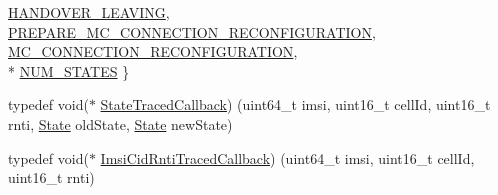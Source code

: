 \begin{DoxyCompactItemize}
\hyperlink{classns3_1_1UeManager_a2f4085fdd18d7125c27da44a5b8b6808ae67953d7b8e117cbd2cab21a1fcde8ad}{H\+A\+N\+D\+O\+V\+E\+R\+\_\+\+L\+E\+A\+V\+I\+NG}, 
\hyperlink{classns3_1_1UeManager_a2f4085fdd18d7125c27da44a5b8b6808aca9c82460eb5d1d8fcebbfc0c4a9167b}{P\+R\+E\+P\+A\+R\+E\+\_\+\+M\+C\+\_\+\+C\+O\+N\+N\+E\+C\+T\+I\+O\+N\+\_\+\+R\+E\+C\+O\+N\+F\+I\+G\+U\+R\+A\+T\+I\+ON}, 
\hyperlink{classns3_1_1UeManager_a2f4085fdd18d7125c27da44a5b8b6808a263ff177d041c66b6a07b69e2be5562e}{M\+C\+\_\+\+C\+O\+N\+N\+E\+C\+T\+I\+O\+N\+\_\+\+R\+E\+C\+O\+N\+F\+I\+G\+U\+R\+A\+T\+I\+ON}, 
\\*
\hyperlink{classns3_1_1UeManager_a2f4085fdd18d7125c27da44a5b8b6808a55259373fd7fb9170cc87c2170d08146}{N\+U\+M\+\_\+\+S\+T\+A\+T\+ES}
 \}
\item 
typedef void($\ast$ \hyperlink{classns3_1_1UeManager_a1f96734afb6ce1a48b78d0db7c987882}{State\+Traced\+Callback}) (uint64\+\_\+t imsi, uint16\+\_\+t cell\+Id, uint16\+\_\+t rnti, \hyperlink{classns3_1_1UeManager_a2f4085fdd18d7125c27da44a5b8b6808}{State} old\+State, \hyperlink{classns3_1_1UeManager_a2f4085fdd18d7125c27da44a5b8b6808}{State} new\+State)
\item 
typedef void($\ast$ \hyperlink{classns3_1_1UeManager_ab48e55f403542cb7718724de271b658b}{Imsi\+Cid\+Rnti\+Traced\+Callback}) (uint64\+\_\+t imsi, uint16\+\_\+t cell\+Id, uint16\+\_\+t rnti)
\end{DoxyCompactItemize}
